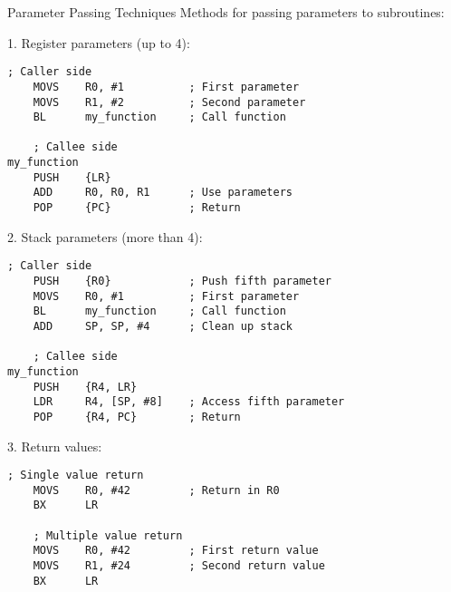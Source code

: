 \begin{KR}{Parameter Passing Techniques}
Methods for passing parameters to subroutines:

1. Register parameters (up to 4):
\begin{lstlisting}[language=armasm, style=basesmol]
    ; Caller side
    MOVS    R0, #1          ; First parameter
    MOVS    R1, #2          ; Second parameter
    BL      my_function     ; Call function
    
    ; Callee side
my_function
    PUSH    {LR}
    ADD     R0, R0, R1      ; Use parameters
    POP     {PC}            ; Return
\end{lstlisting}

2. Stack parameters (more than 4):
\begin{lstlisting}[language=armasm, style=basesmol]
    ; Caller side
    PUSH    {R0}            ; Push fifth parameter
    MOVS    R0, #1          ; First parameter
    BL      my_function     ; Call function
    ADD     SP, SP, #4      ; Clean up stack
    
    ; Callee side
my_function
    PUSH    {R4, LR}
    LDR     R4, [SP, #8]    ; Access fifth parameter
    POP     {R4, PC}        ; Return
\end{lstlisting}

3. Return values:
\begin{lstlisting}[language=armasm, style=basesmol]
    ; Single value return
    MOVS    R0, #42         ; Return in R0
    BX      LR
    
    ; Multiple value return
    MOVS    R0, #42         ; First return value
    MOVS    R1, #24         ; Second return value
    BX      LR
\end{lstlisting}
\end{KR}

